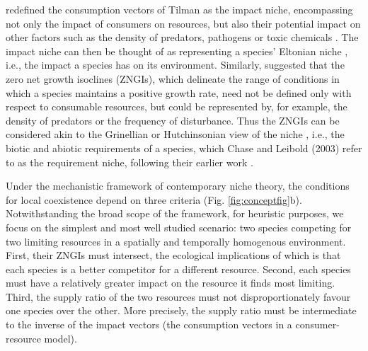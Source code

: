 \citet{Chase2003} redefined the consumption vectors of Tilman as the impact niche,  encompassing not only the impact of consumers on resources, but also their potential impact on other factors such as the density of predators, pathogens or toxic chemicals \citep[see also][]{Grover1997}. The impact niche can then be thought of as representing a species' Eltonian niche \citep{Elton1927}, i.e., the impact a species has on its environment. Similarly, \citet{Chase2003} suggested that the zero net growth isoclines (ZNGIs), which delineate the range of conditions in which a species maintains a positive growth rate, need not be defined only with respect to consumable resources, but could be represented by, for example, the density of predators or the frequency of disturbance. Thus the ZNGIs can be considered akin to the Grinellian or Hutchinsonian view of the niche \citep{10.2307/4072271, hutchinson1957cold}, i.e., the biotic and abiotic requirements of a species, which Chase and Leibold (2003) refer to as the requirement niche, following their earlier work \citep{Leibold1995}.
\par


Under the mechanistic framework of contemporary niche theory, the conditions for local coexistence depend on three criteria (Fig. \ref{fig:conceptfig}b). Notwithstanding the broad scope of the framework, for heuristic purposes, we focus on the simplest and most well studied scenario: two species competing for two limiting resources in a spatially and temporally homogenous environment. First, their ZNGIs must intersect, the ecological implications of which is that each species is a better competitor for a different resource. Second, each species must have a relatively greater impact on the resource it finds most limiting. Third, the supply ratio of the two resources must not disproportionately favour one species over the other. More precisely, the supply ratio must be intermediate to the inverse of the impact vectors (the consumption vectors in a consumer-resource model).
\par


